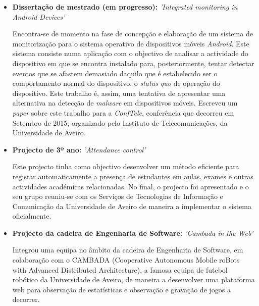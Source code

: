 \documentclass[11pt,a4paper,sans]{moderncv}        %
\begin{document}
\begin{itemize}

\item{\textbf{Dissertação de mestrado (em progresso): } \textit{'Integrated monitoring in Android Devices'}

\vspace{3pt}

\small{Encontra-se de momento na fase de concepção e elaboração de um sistema de monitorização para o sistema operativo de dispositivos móveis \textit{Android}. Este sistema consiste numa aplicação com o objectivo de analisar a actividade do dispositivo em que se encontra instalado para, posteriormente, tentar detectar eventos que se afastem demasiado daquilo que é estabelecido ser o comportamento normal do dispositivo, o \textit{status quo} de operação do dispositivo. Este trabalho é, assim, uma tentativa de apresentar uma alternativa na detecção de \textit{malware} em dispositivos móveis. Escreveu um \textit{paper} sobre este trabalho para a \textit{ConfTele}, conferência que decorreu em Setembro de 2015, organizado pelo Instituto de Telecomunicações, da Universidade de Aveiro.}}

\newpage

\item{\textbf{Projecto de 3º ano: } \textit{'Attendance control'}

\vspace{3pt}

\small{Este projecto tinha como objectivo desenvolver um método eficiente para registar automaticamente a presença de estudantes em aulas, exames e outras actividades académicas relacionadas. No final, o projecto foi apresentado e o seu grupo reuniu-se com os Serviços de Tecnologias de Informação e Comunicação da Universidade de Aveiro de maneira a implementar o sistema oficialmente.}}

\vspace{6pt}

\item{\textbf{Projecto da cadeira de Engenharia de Software: }\textit{'Cambada in the Web'}

\vspace{3pt}

\small{Integrou uma equipa no âmbito da cadeira de Engenharia de Software, em colaboração com o CAMBADA (Cooperative Autonomous Mobile roBots with Advanced Distributed Architecture), a famosa equipa de futebol robótico da Universidade de Aveiro, de maneira a desenvolver uma plataforma web para observação de estatísticas e observação e gravação de jogos a decorrer.}}


\end{itemize}
\end{document}
